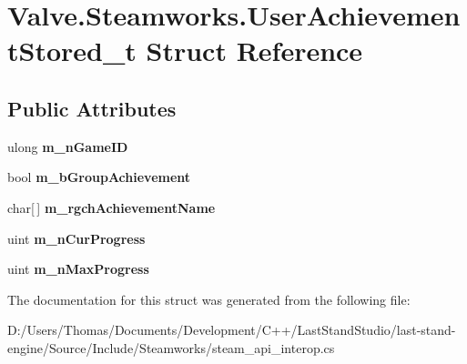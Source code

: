 \hypertarget{structValve_1_1Steamworks_1_1UserAchievementStored__t}{}\section{Valve.\+Steamworks.\+User\+Achievement\+Stored\+\_\+t Struct Reference}
\label{structValve_1_1Steamworks_1_1UserAchievementStored__t}
\subsection*{Public Attributes}
\begin{DoxyCompactItemize}
\item 
\hypertarget{structValve_1_1Steamworks_1_1UserAchievementStored__t_affe479df252ab6d1f3ee71003bcc827c}{}ulong {\bfseries m\+\_\+n\+Game\+I\+D}\label{structValve_1_1Steamworks_1_1UserAchievementStored__t_affe479df252ab6d1f3ee71003bcc827c}

\item 
\hypertarget{structValve_1_1Steamworks_1_1UserAchievementStored__t_a3f73a1a274d980b9648c86120ca57923}{}bool {\bfseries m\+\_\+b\+Group\+Achievement}\label{structValve_1_1Steamworks_1_1UserAchievementStored__t_a3f73a1a274d980b9648c86120ca57923}

\item 
\hypertarget{structValve_1_1Steamworks_1_1UserAchievementStored__t_a70807de14ed106ea85e804b07d5d164c}{}char\mbox{[}$\,$\mbox{]} {\bfseries m\+\_\+rgch\+Achievement\+Name}\label{structValve_1_1Steamworks_1_1UserAchievementStored__t_a70807de14ed106ea85e804b07d5d164c}

\item 
\hypertarget{structValve_1_1Steamworks_1_1UserAchievementStored__t_a1f5fa193ab0533e9c7b40814656e8f85}{}uint {\bfseries m\+\_\+n\+Cur\+Progress}\label{structValve_1_1Steamworks_1_1UserAchievementStored__t_a1f5fa193ab0533e9c7b40814656e8f85}

\item 
\hypertarget{structValve_1_1Steamworks_1_1UserAchievementStored__t_a0716c5d8acea4702b2e2dcd25dbc37c2}{}uint {\bfseries m\+\_\+n\+Max\+Progress}\label{structValve_1_1Steamworks_1_1UserAchievementStored__t_a0716c5d8acea4702b2e2dcd25dbc37c2}

\end{DoxyCompactItemize}


The documentation for this struct was generated from the following file\+:\begin{DoxyCompactItemize}
\item 
D\+:/\+Users/\+Thomas/\+Documents/\+Development/\+C++/\+Last\+Stand\+Studio/last-\/stand-\/engine/\+Source/\+Include/\+Steamworks/steam\+\_\+api\+\_\+interop.\+cs\end{DoxyCompactItemize}
